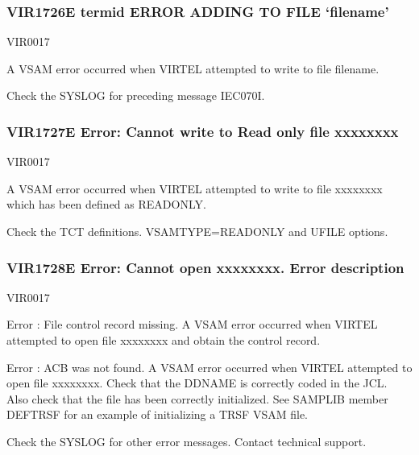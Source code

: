 \documentclass[letterpaper,10pt,english]{sphinxmanual}
\begin{document}
\subsubsection{VIR1726E termid ERROR ADDING TO FILE ‘filename’}
\label{\detokenize{messages:vir1726e-termid-error-adding-to-file-filename}}\begin{description}
\sphinxAtStartPar
VIR0017

\sphinxAtStartPar
A VSAM error occurred when VIRTEL attempted to write to file filename.

\sphinxAtStartPar
Check the SYSLOG for preceding message IEC070I.

\end{description}


\subsubsection{VIR1727E Error: Cannot write to Read only file xxxxxxxx}
\label{\detokenize{messages:vir1727e-error-cannot-write-to-read-only-file-xxxxxxxx}}\begin{description}
\sphinxAtStartPar
VIR0017

\sphinxAtStartPar
A VSAM error occurred when VIRTEL attempted to write to file xxxxxxxx which has been defined as READONLY.

\sphinxAtStartPar
Check the TCT definitions. VSAMTYPE=READONLY and UFILE options.

\end{description}


\subsubsection{VIR1728E Error: Cannot open xxxxxxxx. Error description}
\label{\detokenize{messages:vir1728e-error-cannot-open-xxxxxxxx-error-description}}\begin{description}
\sphinxAtStartPar
VIR0017

\sphinxAtStartPar
Error : File control record missing.
A VSAM error occurred when VIRTEL attempted to open file xxxxxxxx and obtain the control record.

\sphinxAtStartPar
Error : ACB was not found.
A VSAM error occurred when VIRTEL attempted to open file xxxxxxxx. Check that the DDNAME is correctly coded in the JCL. Also check that the file has been correctly initialized. See SAMPLIB
member DEFTRSF for an example of initializing a TRSF VSAM file.

\sphinxAtStartPar
Check the SYSLOG for other error messages. Contact technical support.

\end{description}
\end{document}
